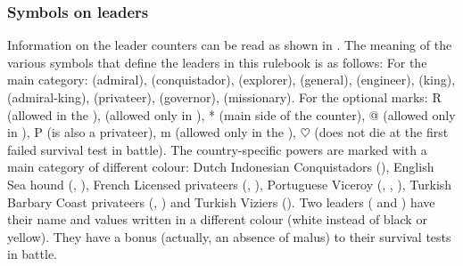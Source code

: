 \subsubsection{Symbols on leaders}
\aparag Information on the leader counters can be read as shown in
.
\aparag \hypertarget{link-meaning-leaders}{The meaning} of the various symbols
that define the leaders in this rulebook is as follows:
\bparag For the main category: \LeaderA (admiral), \LeaderC (conquistador),
\LeaderE (explorer), \LeaderG (general), \LeaderI (engineer), \LeaderK (king),
\Leaderd (admiral-king), \LeaderP (privateer), \LeaderGov (governor),
\LeaderMis (missionary).
\bparag For the optional marks: R (allowed in the \ROTW), \textdollar{}
(allowed only in \continentAmerica), * (main side of the counter), @ (allowed
only in \continentAsia), P (is also a privateer), m (allowed only in the
\regionMediterranee), $\heartsuit$ (does not die at the first failed survival
test in battle).
\bparag The country-specific powers are marked with a main category of
different colour: Dutch Indonesian Conquistadors (\Yconquistador[red]),
English Sea hound (\Yamiral[yellow], \Yexplorateur[yellow]), French Licensed
privateers (\Ycorsaire[red], \Yamiral[red]), Portuguese Viceroy
(\Yconquistador[red], \Yexplorateur[red], \Yamiral[red]), Turkish Barbary
Coast privateers (\Ycorsaire[red], \Yamiral[red]) and Turkish Viziers
(\Ymonarque[yellow]).
\bparag Two leaders ( and ) have
their name and values written in a different colour (white instead of black or
yellow). They have a bonus (actually, an absence of malus) to their survival
tests in battle.



